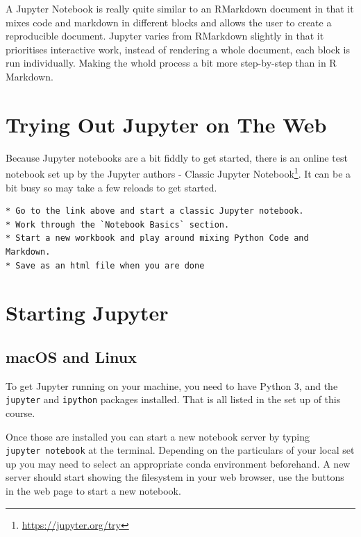 \documentclass[
]{book}
\renewcommand{\href}[2]{#2\footnote{\url{#1}}}
\newenvironment{task}
{ \begin{tcolorbox}[title=For you to do,title filled] }
{  \end{tcolorbox} }
\begin{document}
A Jupyter Notebook is really quite similar to an RMarkdown document in that it mixes code and markdown in different blocks and allows the user to create a reproducible document. Jupyter varies from RMarkdown slightly in that it prioritises interactive work, instead of rendering a whole document, each block is run individually. Making the whold process a bit more step-by-step than in R Markdown.

\hypertarget{trying-out-jupyter-on-the-web}{%
\section{Trying Out Jupyter on The Web}\label{trying-out-jupyter-on-the-web}}

Because Jupyter notebooks are a bit fiddly to get started, there is an online test notebook set up by the Jupyter authors - \href{https://jupyter.org/try}{Classic Jupyter Notebook}. It can be a bit busy so may take a few reloads to get started.

\begin{task}
\begin{verbatim}
* Go to the link above and start a classic Jupyter notebook. 
* Work through the `Notebook Basics` section.
* Start a new workbook and play around mixing Python Code and Markdown.
* Save as an html file when you are done
\end{verbatim}
\end{task}

\hypertarget{starting-jupyter}{%
\section{Starting Jupyter}\label{starting-jupyter}}

\hypertarget{macos-and-linux}{%
\subsection{macOS and Linux}\label{macos-and-linux}}

To get Jupyter running on your machine, you need to have Python 3, and the \texttt{jupyter} and \texttt{ipython} packages installed. That is all listed in the set up of this course.

Once those are installed you can start a new notebook server by typing \texttt{jupyter\ notebook} at the terminal. Depending on the particulars of your local set up you may need to select an appropriate conda environment beforehand. A new server should start showing the filesystem in your web browser, use the buttons in the web page to start a new notebook.
\end{document}
